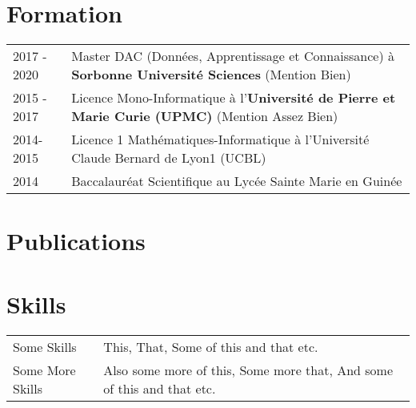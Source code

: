 \documentclass[a4paper,12pt]{article}
\begin{document}
\section{Formation}
\begin{tabularx}{\linewidth}{@{}l X@{}}	
2017 - 2020 & Master DAC (Données, Apprentissage et Connaissance) à \textbf{Sorbonne Université Sciences} \hfill \normalsize (Mention Bien) \\

2015 - 2017 & Licence Mono-Informatique à l'\textbf{Université de Pierre et Marie Curie (UPMC)} \hfill (Mention Assez Bien) \\ 

2014-2015 & Licence 1 Mathématiques-Informatique à l'Université Claude Bernard de Lyon1 (UCBL)\\

2014 & Baccalauréat Scientifique au Lycée Sainte Marie en Guinée \\
\end{tabularx}

\section{Publications}
\begin{refsection}
\nocite{*}
\printbibliography[heading=none]
\end{refsection}

\section{Skills}
\begin{tabularx}{\linewidth}{@{}l X@{}}
Some Skills &  \normalsize{This, That, Some of this and that etc.}\\
Some More Skills  &  \normalsize{Also some more of this, Some more that, And some of this and that etc.}\\  
\end{tabularx}

\vfill
{}
\end{document}
